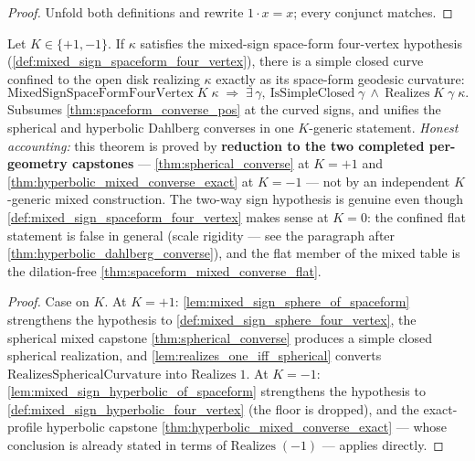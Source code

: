 \begin{proof}
  \leanok
  Unfold both definitions and rewrite $1\cdot x=x$; every conjunct matches.
\end{proof}

\begin{theorem}
  \label{thm:spaceform_mixed_converse}
  Let $K\in\{+1,-1\}$. If $\kappa$ satisfies the mixed-sign space-form
  four-vertex hypothesis (\cref{def:mixed_sign_spaceform_four_vertex}), there is
  a simple closed curve confined to the open disk realizing $\kappa$ exactly as
  its space-form geodesic curvature:
  \[
    \mathrm{MixedSignSpaceFormFourVertex}\;K\;\kappa
    \;\Longrightarrow\;
    \exists\,\gamma,\ \mathrm{IsSimpleClosed}\;\gamma\ \wedge\
    \mathrm{Realizes}\;K\;\gamma\;\kappa.
  \]
  Subsumes \cref{thm:spaceform_converse_pos} at the curved signs, and unifies
  the spherical and hyperbolic Dahlberg converses in one $K$-generic
  statement.
  \emph{Honest accounting:} this theorem is proved by \textbf{reduction to the
  two completed per-geometry capstones} — \cref{thm:spherical_converse} at
  $K=+1$ and \cref{thm:hyperbolic_mixed_converse_exact} at
  $K=-1$ — not by an independent $K$-generic mixed
  construction. The two-way sign hypothesis is genuine even though
  \cref{def:mixed_sign_spaceform_four_vertex} makes sense at $K=0$:
  the confined flat statement is false in general (scale rigidity — see the
  paragraph after \cref{thm:hyperbolic_dahlberg_converse}), and the flat member
  of the mixed table is the dilation-free
  \cref{thm:spaceform_mixed_converse_flat}.
\end{theorem}

\begin{proof}
  \leanok
  Case on $K$. At $K=+1$:
  \cref{lem:mixed_sign_sphere_of_spaceform} strengthens the hypothesis to
  \cref{def:mixed_sign_sphere_four_vertex}, the spherical mixed capstone
  \cref{thm:spherical_converse} produces a simple closed spherical realization,
  and \cref{lem:realizes_one_iff_spherical} converts
  $\mathrm{RealizesSphericalCurvature}$ into $\mathrm{Realizes}\;1$. At
  $K=-1$: \cref{lem:mixed_sign_hyperbolic_of_spaceform} strengthens
  the hypothesis to \cref{def:mixed_sign_hyperbolic_four_vertex} (the floor is
  dropped), and the exact-profile hyperbolic capstone
  \cref{thm:hyperbolic_mixed_converse_exact} — whose conclusion is already
  stated in terms of $\mathrm{Realizes}\;(-1)$ — applies directly.
\end{proof}

